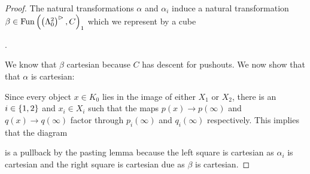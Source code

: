 \begin{lemma}
\begin{proof}
        The natural transformations $\alpha$ and $\alpha_i$ induce a natural transformation $\beta\in\operatorname{Fun}\left(\left(\Lambda_0^2\right)^{\rhd}, C\right)_1$ which we represent by a cube
        \begin{center}
            \;.
        \end{center}
        We know that $\beta$ cartesian because $C$ has descent for pushouts.
        We now show that that $\alpha$ is cartesian:

        Since every object $x\in K_0$ lies in the image of either $X_1$ or $X_2$, there is an $i\in\left\lbrace1,2\right\rbrace$ and $x_i\in X_i$ such that the maps $p(x)\to p(\infty)$ and $q(x)\to q(\infty)$ factor through $p_i(\infty)$ and $q_i(\infty)$ respectively.
        This implies that the diagram
        \begin{center}
        \end{center}
        is a pullback by the pasting lemma because the left square is cartesian as $\alpha_i$ is cartesian and the right square is cartesian due as $\beta$ is cartesian.


\end{proof}
\end{lemma}
